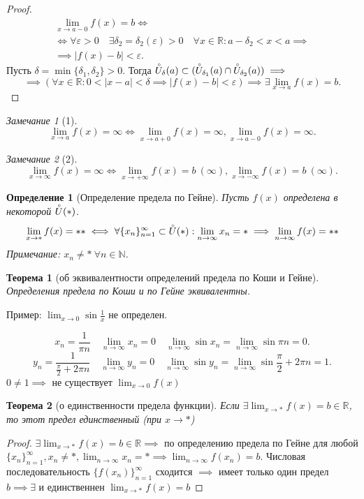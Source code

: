 \documentclass[a4paper,12pt]{article} %
\newtheorem{definition}{Определение}[subsection]
\newtheorem{theorem}{Теорема}[subsection]
\theoremstyle{remark}
\newtheorem*{remark}{Замечание}
\begin{document}
\begin{proof}
	\begin{multline}
		\lim_{x \to a-0} f(x) = b \iff \\
		\iff \forall \varepsilon>0 \quad \exists \delta_2 = \delta_2(\varepsilon)>0 \quad \forall x\in \mathbb{R} : a -\delta_2 < x < a \implies \\
		\implies |f(x) - b| < \varepsilon.
	\end{multline}
	Пусть $\delta = \min \{\delta_1, \delta_2\} > 0$. Тогда $\accentset{\circ}{U}_\delta(a)\subset (\accentset{\circ}{U}_{\delta_1}(a)\cap \accentset{\circ}{U}_{\delta_2}(a)) \implies$
	\[
		\implies (\forall x\in \mathbb{R} : 0 < |x-a| < \delta \implies |f(x)-b| < \varepsilon) \implies \exists \lim_{x \to a} f(x) = b
	.\]
\end{proof}

\begin{remark}[1]
		\[
		\lim_{x \to a} f(x) = \infty \iff \lim_{x \to a+0} f(x) = \infty, \lim_{x \to a-0} f(x) = \infty
		.\] 
\end{remark}
\begin{remark}[2]
	\[
		\lim_{x \to \infty} f(x) = \infty \iff \lim_{x \to +\infty} f(x) = b \ (\infty), \lim_{x \to -\infty} f(x) = b \ (\infty)
	.\] 
\end{remark}

\begin{definition}[Определение предела по Гейне]
	Пусть $f(x)$ определена в некоторой $\accentset{\circ}{U}(*)$.
	\[
	\lim_{x \to *} f(x) = ** \iff \forall \{x_n\}_{n=1}^{\infty} \subset \accentset{\circ}{U}(*) : \lim_{n \to \infty} x_n = * \implies \lim_{n \to \infty} f(x) = **
	\]
Примечание: $x_n \neq * \ \forall n\in \mathbb{N}$.
\end{definition}

\begin{theorem}[об эквивалентности определений предела по Коши и Гейне]
	Определения предела по Коши и по Гейне эквивалентны.
\end{theorem}
Пример:
$\lim_{x \to 0} \sin{\frac{1}{x}}$ не определен.

\[
	x_n = \frac{1}{\pi n} \quad \lim_{n \to \infty} x_n = 0 \quad \lim_{n \to \infty} \sin{x_n} = \lim_{n \to \infty} \sin{\pi n} = 0
.\] 
\[
	y_n = \frac{1}{\frac{\pi}{2} + 2\pi n} \quad \lim_{n \to \infty} y_n = 0 \quad \lim_{n \to \infty} \sin{y_n} = \lim_{n \to \infty} \sin{\frac{\pi}{2} + 2\pi n} = 1
.\] 
$0 \neq 1 \implies$ не существует $\lim_{x \to 0} f(x)$

\begin{theorem}[о единственности предела функции]
	Если $\exists \lim_{x \to *} f(x) = b \in  \mathbb{R}$, то этот предел единственный (при $x \to *$)
\end{theorem}
\begin{proof}
	$\exists  \lim_{x \to *} f(x) = b \in \mathbb{R} \implies$ по определению предела по Гейне для любой $\{x_n\}_{n=1}^{\infty}, x_n \neq  *, \lim_{n \to \infty} x_n = * \implies \lim_{n \to \infty} f(x_n) = b$. Числовая последовательность $\{f(x_n)\}_{n=1}^{\infty}$ сходится $\implies$ имеет только один предел $b \implies \exists $ и единственнен $\lim_{x \to *} f(x) = b$
\end{proof}
\end{document}
